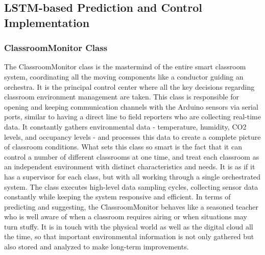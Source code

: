 \subsection{LSTM-based Prediction and Control Implementation}

\subsubsection{ClassroomMonitor Class}
The ClassroomMonitor class is the mastermind of the entire smart classroom system, coordinating all the moving components like a conductor guiding an orchestra. It is the principal control center where all the key decisions regarding classroom environment management are taken. This class is responsible for opening and keeping communication channels with the Arduino sensors via serial ports, similar to having a direct line to field reporters who are collecting real-time data. It constantly gathers environmental data - temperature, humidity, CO2 levels, and occupancy levels - and processes this data to create a complete picture of classroom conditions.
What sets this class so smart is the fact that it can control a number of different classrooms at one time, and treat each classroom as an independent environment with distinct characteristics and needs. It is as if it has a supervisor for each class, but with all working through a single orchestrated system. The class executes high-level data sampling cycles, collecting sensor data constantly while keeping the system responsive and efficient. In terms of predicting and suggesting, the ClassroomMonitor behaves like a seasoned teacher who is well aware of when a classroom requires airing or when situations may turn stuffy. It is in touch with the physical world as well as the digital cloud all the time, so that important environmental information is not only gathered but also stored and analyzed to make long-term improvements.

